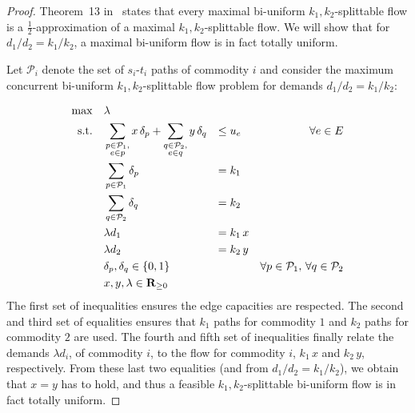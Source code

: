 \begin{proof}
  Theorem~13 in~\cite{baier-koehler-skutella:05} states that every
  maximal bi-uniform $k_1,k_2$-splittable flow is a
  $\frac{1}{2}$-approximation of a maximal $k_1,k_2$-splittable
  flow. We will show that for $d_1/d_2 = k_1/k_2$, a maximal
  bi-uniform flow is in fact totally uniform.

  Let ${\mathcal P}_i$ denote the set of $s_i$-$t_i$ paths of commodity 
  $i$ and consider the maximum concurrent bi-uniform 
  $k_1,k_2$-splittable flow problem for demands $d_1/d_2=k_1/k_2$:
 
\begin{equation}
\label{xyz}
\begin{aligned}
\max \quad & \lambda\\
\mbox{s.t.} \quad& \sum\limits_{\substack{p \in {\mathcal P}_1,\\ e \in p}}{x \, \delta_p} 
+ \sum\limits_{\substack{q \in {\mathcal P}_2,\\e \in q}}{y \, \delta_q} &\leq \;& u_e & \forall e \in E\\
& \sum\limits_{p \in {\mathcal P}_1}{\delta_p} & =\; & k_1\\
& \sum\limits_{q \in {\mathcal P}_2}{\delta_q} & =\; & k_2\\
& \lambda d_1 & =\; & k_1 \, x\\
&\lambda d_2 & =\; & k_2 \, y\\
& \delta_p, \delta_q \in \{0,1\} &&\;& \forall p \in {\mathcal P}_1, \, \forall q \in {\mathcal P}_2\\
& x, y, \lambda \in \mathbf{R}_{\geq0} \\
\end{aligned}
\end{equation}
The first set of inequalities ensures the edge capacities are
respected. The second and third set of equalities ensures that $k_1$
paths for commodity $1$ and $k_2$ paths for commodity $2$ are
used. The fourth and fifth set of inequalities finally relate the
demands $\lambda d_i$, of commodity $i$, to the flow for commodity
$i$, $k_1\,x$ and $k_2 \, y$, respectively. From these last two
equalities (and from $d_1/d_2=k_1/k_2$), we obtain that $x = y$ has 
to hold, and thus a feasible $k_1,k_2$-splittable bi-uniform flow is 
in fact totally uniform. 


\end{proof}
